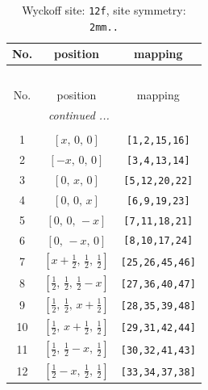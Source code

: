 \documentclass[fleqn,8pt]{jsarticle}
\begin{document}
\begin{longtable}{ccc}
\caption{Wyckoff site: {\tt 12f}, site symmetry: {\tt 2mm..}}
 \\
 \hline \hline
No. & position & mapping \\ \hline \endfirsthead

\multicolumn{2}{l}{\tablename\ \thetable{}} \\
 \hline \hline
No. & position & mapping \\ \hline \endhead

 \hline \hline
\multicolumn{2}{r}{\footnotesize\it continued ...} \\ \endfoot

 \hline \hline
\multicolumn{2}{r}{} \\ \endlastfoot

1 & $\left[ x,\, 0,\, 0 \right]$ & {\tt [1,2,15,16]} \\ \hline
2 & $\left[ - x,\, 0,\, 0 \right]$ & {\tt [3,4,13,14]} \\ \hline
3 & $\left[ 0,\, x,\, 0 \right]$ & {\tt [5,12,20,22]} \\ \hline
4 & $\left[ 0,\, 0,\, x \right]$ & {\tt [6,9,19,23]} \\ \hline
5 & $\left[ 0,\, 0,\, - x \right]$ & {\tt [7,11,18,21]} \\ \hline
6 & $\left[ 0,\, - x,\, 0 \right]$ & {\tt [8,10,17,24]} \\ \hline
7 & $\left[ x + \frac{1}{2},\, \frac{1}{2},\, \frac{1}{2} \right]$ & {\tt [25,26,45,46]} \\ \hline
8 & $\left[ \frac{1}{2},\, \frac{1}{2},\, \frac{1}{2} - x \right]$ & {\tt [27,36,40,47]} \\ \hline
9 & $\left[ \frac{1}{2},\, \frac{1}{2},\, x + \frac{1}{2} \right]$ & {\tt [28,35,39,48]} \\ \hline
10 & $\left[ \frac{1}{2},\, x + \frac{1}{2},\, \frac{1}{2} \right]$ & {\tt [29,31,42,44]} \\ \hline
11 & $\left[ \frac{1}{2},\, \frac{1}{2} - x,\, \frac{1}{2} \right]$ & {\tt [30,32,41,43]} \\ \hline
12 & $\left[ \frac{1}{2} - x,\, \frac{1}{2},\, \frac{1}{2} \right]$ & {\tt [33,34,37,38]} \\
\end{longtable}
\renewcommand{\arraystretch}{1.2}
\end{document}
